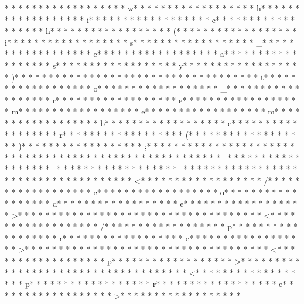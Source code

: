 * * *  * * *  * * *  *  * * *  *  * * *  * w* * *  * * *  * * *  *  * * *  *  * * *  * h* * *  * * *  * * *  *  * * *  *  * * *  * i* * *  * * *  * * *  *  * * *  *  * * *  * c* * *  * * *  * * *  *  * * *  *  * * *  * h* * *  * * *  * * *  *  * * *  *  * * *  * (* * *  * * *  * * *  *  * * *  *  * * *  * i* * *  * * *  * * *  *  * * *  *  * * *  * s* * *  * * *  * * *  *  * * *  *  * * *  * _* * *  * * *  * * *  *  * * *  *  * * *  * e* * *  * * *  * * *  *  * * *  *  * * *  * a* * *  * * *  * * *  *  * * *  *  * * *  * s* * *  * * *  * * *  *  * * *  *  * * *  * y* * *  * * *  * * *  *  * * *  *  * * *  * )* * *  * * *  * * *  *  * * *  *  * * *  *  * * *  * * *  * * *  *  * * *  *  * * *  * t* * *  * * *  * * *  *  * * *  *  * * *  * o* * *  * * *  * * *  *  * * *  *  * * *  * _* * *  * * *  * * *  *  * * *  *  * * *  * r* * *  * * *  * * *  *  * * *  *  * * *  * e* * *  * * *  * * *  *  * * *  *  * * *  * m* * *  * * *  * * *  *  * * *  *  * * *  * e* * *  * * *  * * *  *  * * *  *  * * *  * m* * *  * * *  * * *  *  * * *  *  * * *  * b* * *  * * *  * * *  *  * * *  *  * * *  * e* * *  * * *  * * *  *  * * *  *  * * *  * r* * *  * * *  * * *  *  * * *  *  * * *  * (* * *  * * *  * * *  *  * * *  *  * * *  * )* * *  * * *  * * *  *  * * *  *  * * *  * ;* * *  * * *  * * *  *  * * *  *  * * *  * 
* * *  * * *  * * *  *  * * *  *  * * *  * 
* * *  * * *  * * *  *  * * *  *  * * *  * ~* * *  * * *  * * *  *  * * *  *  * * *  * ~* * *  * * *  * * *  *  * * *  *  * * *  * ~* * *  * * *  * * *  *  * * *  *  * * *  * 
* * *  * * *  * * *  *  * * *  *  * * *  * <* * *  * * *  * * *  *  * * *  *  * * *  * /* * *  * * *  * * *  *  * * *  *  * * *  * c* * *  * * *  * * *  *  * * *  *  * * *  * o* * *  * * *  * * *  *  * * *  *  * * *  * d* * *  * * *  * * *  *  * * *  *  * * *  * e* * *  * * *  * * *  *  * * *  *  * * *  * >* * *  * * *  * * *  *  * * *  *  * * *  * 
* * *  * * *  * * *  *  * * *  *  * * *  * <* * *  * * *  * * *  *  * * *  *  * * *  * /* * *  * * *  * * *  *  * * *  *  * * *  * p* * *  * * *  * * *  *  * * *  *  * * *  * r* * *  * * *  * * *  *  * * *  *  * * *  * e* * *  * * *  * * *  *  * * *  *  * * *  * >* * *  * * *  * * *  *  * * *  *  * * *  * 
* * *  * * *  * * *  *  * * *  *  * * *  * <* * *  * * *  * * *  *  * * *  *  * * *  * p* * *  * * *  * * *  *  * * *  *  * * *  * >* * *  * * *  * * *  *  * * *  *  * * *  * 
* * *  * * *  * * *  *  * * *  *  * * *  * <* * *  * * *  * * *  *  * * *  *  * * *  * p* * *  * * *  * * *  *  * * *  *  * * *  * r* * *  * * *  * * *  *  * * *  *  * * *  * e* * *  * * *  * * *  *  * * *  *  * * *  * >* * *  * * *  * * *  *  * * *  *  * * *  * 
